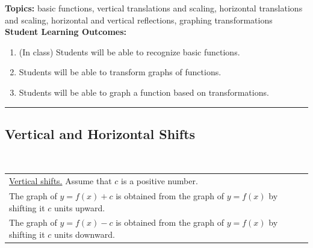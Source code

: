 

\noindent \textbf{Topics:}  basic functions, vertical translations and scaling, horizontal translations and scaling, horizontal and vertical reflections, graphing transformations\\

\noindent \textbf{Student Learning Outcomes:}
\begin{enumerate}
\item (In class) Students will be able to recognize basic functions.
\item Students will be able to transform graphs of functions.
\item Students will be able to graph a function based on transformations.
\end{enumerate}

\hrule 

\bigskip


\subsection{Vertical and Horizontal Shifts} ~

\hspace{-.4in} \begin{tabular}{| l |} \hline \underline{Vertical shifts.} Assume that $c$ is a positive number. \\
The graph of $y = f(x)+c$ is obtained from the graph of $y=f(x)$ by shifting it $c$ units upward. \\
The graph of $y = f(x)-c$ is obtained from the graph of $y=f(x)$ by shifting it $c$ units downward.
 \\ \hline
\end{tabular}

